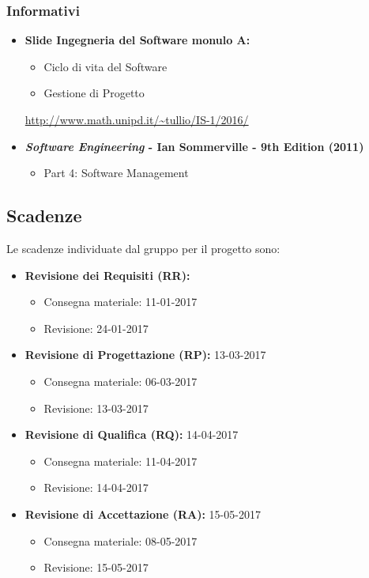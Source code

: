 \subsubsection{Informativi}
\begin{itemize}
\item \textbf{Slide Ingegneria del Software monulo A:}
\begin{itemize}
\item Ciclo di vita del Software
\item Gestione di Progetto
\end{itemize}
\url{http://www.math.unipd.it/~tullio/IS-1/2016/}
\item \textbf{\textit{Software Engineering} - Ian Sommerville - 9th Edition (2011)}
\begin{itemize}
\item Part 4: Software Management
\end{itemize} 
\end{itemize}

\subsection{Scadenze}
Le scadenze individuate dal gruppo \GroupName{} per il progetto \ProjectName{} sono:
\begin{itemize}
	\item \textbf{Revisione dei Requisiti (RR):}
	\begin{itemize}
		\item Consegna materiale: 11-01-2017
		\item Revisione: 24-01-2017
	\end{itemize}
	\item \textbf{Revisione di Progettazione (RP):} 13-03-2017
	\begin{itemize}
		\item Consegna materiale: 06-03-2017
		\item Revisione: 13-03-2017
	\end{itemize}
	\item \textbf{Revisione di Qualifica (RQ):} 14-04-2017
	\begin{itemize}
		\item Consegna materiale: 11-04-2017
		\item Revisione: 14-04-2017
	\end{itemize}
	\item \textbf{Revisione di Accettazione (RA):} 15-05-2017
	\begin{itemize}
		\item Consegna materiale: 08-05-2017
		\item Revisione: 15-05-2017
	\end{itemize}
\end{itemize}

